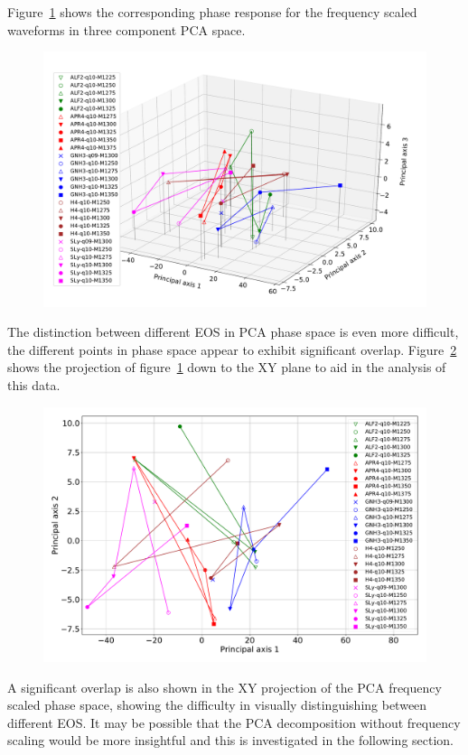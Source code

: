 Figure~\ref{fig:PCAScaled3Dphase} shows the corresponding phase response for the frequency scaled waveforms in three component PCA space.
\begin{figure}[H]
	\centering
	\includegraphics[width=15cm]{./img/PCAScaled3Dphase.pdf} 
	\caption[\protect]{\protect}
	\label{fig:PCAScaled3Dphase}
\end{figure}
The distinction between different EOS in PCA phase space is even more difficult, the different points in phase space appear to exhibit significant overlap. Figure~\ref{fig:PCAScaled2Dphase} shows the projection of figure~\ref{fig:PCAScaled3Dphase} down to the XY plane to aid in the analysis of this data.
\begin{figure}[H]
	\centering
	\includegraphics[width=15cm]{./img/PCAScaled2Dphase.pdf} 
	\caption[\protect]{\protect}
	\label{fig:PCAScaled2Dphase}
\end{figure}
A significant overlap is also shown in the XY projection of the PCA frequency scaled phase space, showing the difficulty in visually distinguishing between different EOS. It may be possible that the PCA decomposition without frequency scaling would be more insightful and this is investigated in the following section.\par

